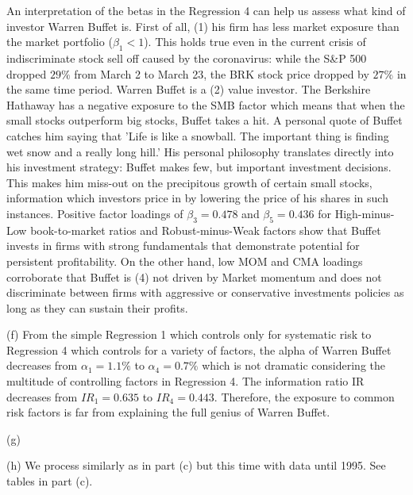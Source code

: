 \documentclass[10pt]{article}
\newenvironment{exercise}[2][Exercise]{\begin{trivlist}
  \item[\hskip \labelsep {\bfseries #1}\hskip \labelsep {\bfseries #2.}]}{\end{trivlist}}
\begin{document}
\begin{exercise}{3}
An interpretation of the betas in the Regression 4 can help us assess what kind
of investor Warren Buffet is. First of all, (1) his firm has less market exposure
than the market portfolio ($\beta_1 < 1$). This holds true even in the current
crisis of indiscriminate stock sell off caused by the coronavirus: while the S\&P 500 dropped $29\%$
from March 2 to March 23, the BRK stock price dropped by $27 \%$ in the same
time period. Warren Buffet
is a (2) value investor. The Berkshire Hathaway has a negative exposure to the
SMB factor which means that when the small stocks outperform big stocks, Buffet
takes a hit. A personal quote of Buffet catches him saying that 'Life is like a
snowball. The important thing is finding wet snow and a really long hill.' His
personal philosophy translates directly into his investment strategy: Buffet
makes few, but important investment decisions. This makes him miss-out on the
precipitous growth of certain small stocks, information which investors price in by lowering the price of his
shares in such instances. Positive factor loadings of $\beta_3 = 0.478$ and $\beta_5 = 0.436$ for
High-minus-Low book-to-market ratios and Robust-minus-Weak factors show that
Buffet invests in firms with strong fundamentals that demonstrate potential
for persistent profitability. On the other hand, low MOM and CMA loadings corroborate
that Buffet is (4) not driven by Market momentum and does not discriminate
between firms with aggressive or conservative investments policies as long as
they can sustain their profits.

(f) From the simple Regression 1 which controls only for systematic risk to
Regression 4 which controls for a variety of factors, the alpha of Warren Buffet
decreases from $\alpha_1 = 1.1\%$ to $\alpha_4 = 0.7 \%$ which is not dramatic
considering the multitude of controlling factors in Regression 4. The
information ratio IR decreases from $IR_1 = 0.635$ to $IR_4 = 0.443$. Therefore, the
exposure to common risk factors is far from explaining the full genius of Warren
Buffet. 


(g)


	
	(h) We process similarly as in part (c) but this time with data until 1995. See tables in part (c).

\end{exercise}
  
\end{document}

